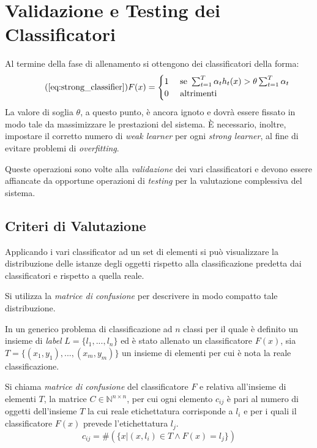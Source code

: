 
\chapter{Validazione e Testing dei Classificatori}
\label{chap:tuning}
    Al termine della fase di allenamento si ottengono dei classificatori della forma: 
    \begin{equation}\tag{\ref{eq:strong_classifier}}
        F(x) = 
        \begin{cases}
            1 & \text{ se } \sum_{t = 1}^{T} \alpha_t h_t(x) > \theta \sum_{t = 1}^{T} \alpha_t \\
            0 & \text{ altrimenti }
        \end{cases}
    \end{equation}
    La valore di soglia $\theta$, a questo punto, è ancora ignoto e dovrà essere fissato in modo tale da massimizzare le prestazioni del sistema. È necessario, inoltre, impostare il corretto numero di \emph{weak learner} per ogni \emph{strong learner}, al fine di evitare problemi di \emph{overfitting}.
    
    Queste operazioni sono volte alla \emph{validazione} dei vari classificatori e devono essere affiancate da opportune operazioni di \emph{testing} per la valutazione complessiva del sistema.

    \section{Criteri di Valutazione}
    \label{sec:evaluation_criteria}
        Applicando i vari classificator ad un set di elementi si può visualizzare la distribuzione delle istanze degli oggetti rispetto alla classificazione predetta dai classificatori e rispetto a quella reale.

        Si utilizza la \emph{matrice di confusione} per descrivere in modo compatto tale distribuzione.

        \begin{definition}
            In un generico problema di classificazione ad $n$ classi per il quale è definito un insieme di \emph{label} $L = \{l_1,..., l_n\}$ ed è stato allenato un classificatore $F(x)$, sia $T = \{(x_1,y_1),..., (x_m, y_m)\}$ un insieme di elementi per cui è nota la reale classificazione.

            Si chiama \emph{matrice di confusione} del classificatore $F$ e relativa all'insieme di elementi $T$, la matrice $C \in \mathbb{N}^{n \times n}$, per cui ogni elemento $c_{ij}$ è pari al numero di oggetti dell'insieme $T$ la cui reale etichettatura corrisponde a $l_i$ e per i quali il classificatore $F(x)$ prevede l'etichettatura $l_j$.
            \begin{equation}
            \label{subeq:confusion_matrix_element}
                 c_{ij} = \#(\{x|(x,l_i) \in T \wedge F(x) = l_j\})
            \end{equation} 
        \end{definition}

